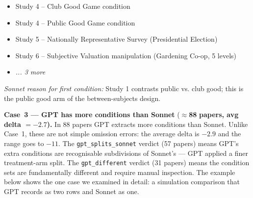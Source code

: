 \documentclass[11pt,a4paper]{article}
\begin{document}
\begin{tcolorbox}
\begin{itemize}[leftmargin=*,noitemsep,topsep=0pt]
\item Study 4 – Club Good Game condition
\item Study 4 – Public Good Game condition
\item Study 5 – Nationally Representative Survey (Presidential Election)
\item Study 6 – Subjective Valuation manipulation (Gardening Co-op, 5 levels)
\item \textit{... 3 more}
          \end{itemize}
          \medskip\textit{Sonnet reason for first condition:} Study 1 contrasts public vs. club good; this is the public good arm of the between-subjects design.
          \end{tcolorbox}


\textbf{Case~3 --- GPT has more conditions than Sonnet}
($\approx$\textbf{88} \textbf{papers, avg delta $=-2.7$).}
        In 88 papers GPT extracts more conditions than Sonnet.  Unlike Case~1,
        these are not simple omission errors: the average delta is $-2.9$ and
        the range goes to $-11$.  The \texttt{gpt\_splits\_sonnet} verdict
        (57 papers) means GPT's extra conditions are recognisable subdivisions
        of Sonnet's --- GPT applied a finer treatment-arm split.
        The \texttt{gpt\_different} verdict (31 papers) means the condition sets
        are fundamentally different and require manual inspection.
        The example below shows the one case we examined in detail: a simulation
        comparison that GPT records as two rows and Sonnet as one.
\end{document}
